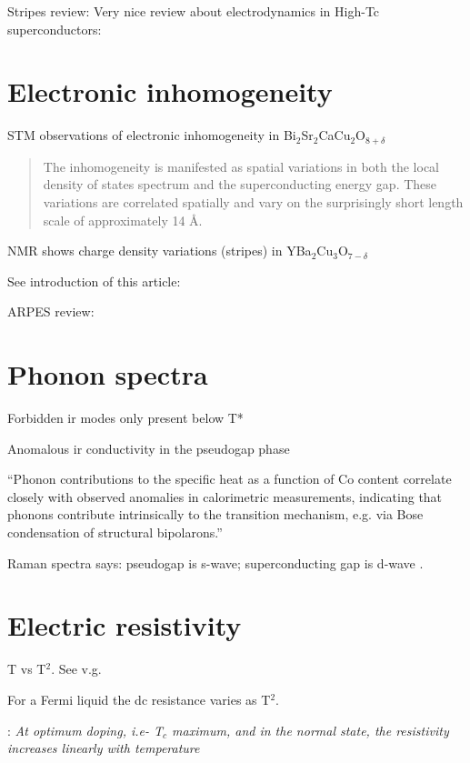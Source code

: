Stripes review: \cite{Kivelson2003}
Very nice review about electrodynamics in High-Tc superconductors: \cite{Basov2005} 

\section{Electronic inhomogeneity}
\label{sec:electronic_inhomogeneity}

STM observations of electronic inhomogeneity in Bi$_2$Sr$_2$CaCu$_2$O$_{8+\delta}$ \cite{Pan2001} \begin{quote}The inhomogeneity is manifested as spatial variations in both the local density of states spectrum and the superconducting energy gap. These variations are correlated spatially and vary on the surprisingly short length scale of approximately 14 \AA. \end{quote}

NMR shows charge density variations (stripes) in YBa$_2$Cu$_3$O$_{7-\delta}$ \cite{Haase2003}

See introduction of this article: \cite{Ivanov1995}

ARPES review: \cite{Damascelli2003}

\section{Phonon spectra}
\label{sec:phonon_spectra}

Forbidden ir modes only present below T* \cite{?}

Anomalous ir conductivity in the pseudogap phase \cite{Basov1996}

``Phonon contributions to the specific heat as a function of Co content correlate closely with observed anomalies in calorimetric measurements, indicating that phonons contribute intrinsically to the transition mechanism, e.g. via Bose condensation of structural bipolarons.'' \cite{Obhi1990} 

Raman spectra says: pseudogap is s-wave; superconducting gap is d-wave \cite{Sakai2013}.


\section{Electric resistivity}
\label{sec:resistivity}

T vs T$^2$. See v.g. \cite{Timusk1999}

For a Fermi liquid the dc resistance varies as T$^2$.

\cite{Muller2007}: \textit{At optimum doping, i.e- T$_c$ maximum, and in the normal state, the resistivity increases linearly with temperature}

